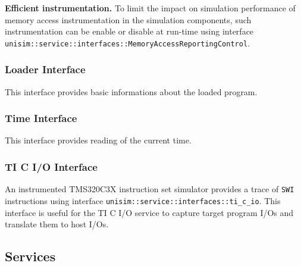 \begin{center}
	
\end{center}

\textbf{Efficient instrumentation.} To limit the impact on simulation performance of memory access instrumentation in the simulation components, such instrumentation can be enable or disable at run-time using interface \texttt{unisim::service::interfaces::MemoryAccessReportingControl}.

\begin{center}
	
\end{center}

\subsubsection{Loader Interface}

This interface provides basic informations about the loaded program.

\begin{center}
	
\end{center}

\subsubsection{Time Interface}

This interface provides reading of the current time.

\begin{center}
	
\end{center}

\subsubsection{TI C I/O Interface}

An instrumented TMS320C3X instruction set simulator provides a trace of \texttt{SWI} instructions using interface \texttt{unisim::service::interfaces::ti\_c\_io}.
This interface is useful for the TI C I/O service to capture target program I/Os and translate them to host I/Os.

\begin{center}
	
\end{center}

\newpage
\subsection{Services}
